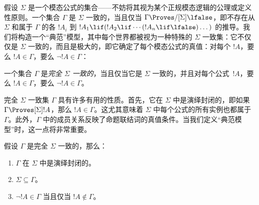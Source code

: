 \documentclass[../../../include/open-logic-section]{subfiles}
\begin{document}


假设 $\Sigma$ 是一个模态公式的集合——不妨将其视为某个正规模态逻辑的公理或定义性原则。一个集合 $\Gamma$ 是 $\Sigma$ 一致的，当且仅当 $\Gamma \Proves/[\Sigma] \lfalse$，即不存在从 $\Sigma$ 和属于 $\Gamma$ 的各 $!A_i$ 到 $!A_1 \lif (!A_2 \lif \cdots (!A_n \lif
\lfalse)\dots)$ 的推导。我们将构造一个“典范”模型，其中每个世界都被视为一种特殊的 $\Sigma$ 一致集：它不仅仅是 $\Sigma$ 一致的，而且是极大的，即它确定了每个模态公式的真值：对每个 $!A$，要么 $!A \in \Gamma$，要么 $\lnot !A \in \Gamma$：

\begin{defn}
  一个集合 $\Gamma$ 是\emph{完全 $\Sigma$ 一致的}，当且仅当它是 $\Sigma$ 一致的，并且对每个公式~$!A$，要么 $!A \in \Gamma$，要么 $\lnot !A \in \Gamma$。
\end{defn}

完全 $\Sigma$ 一致集 $\Gamma$ 具有许多有用的性质。首先，它在 $\Sigma$ 中是演绎封闭的，即如果 $\Gamma \Proves[\Sigma] !A$，那么 $!A \in \Gamma$。这尤其意味着 $\Sigma$ 中每个公式的所有实例也都属于 $\Gamma$。此外，$\Gamma$ 中的成员关系反映了命题联结词的真值条件。当我们定义“典范模型”时，这一点将非常重要。

\begin{prop}
  假设 $\Gamma$ 是完全 $\Sigma$ 一致的，那么：
  \begin{enumerate}
  \item {}%
    $\Gamma$ 在 $\Sigma$ 中是演绎封闭的。
  \item {}%
    $\Sigma \subseteq \Gamma$。
  \item {}%
    $\lnot!A \in \Gamma$ 当且仅当 $!A \notin \Gamma$。
  \end{enumerate}
\end{prop}
\end{document}
